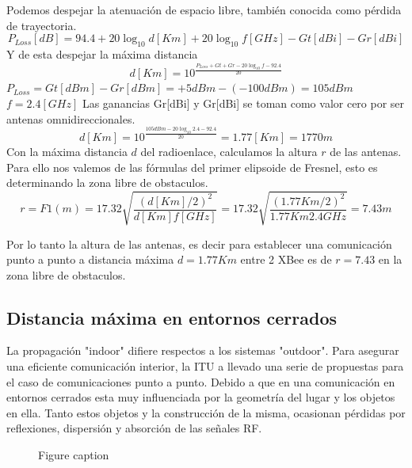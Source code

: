 \documentclass[11pt,oneside,spanish,a4paper]{article}
\begin{document}
Podemos despejar la atenuaci\'on de espacio libre, tambi\'en conocida como p\'erdida de trayectoria.
\begin{equation*}
\label{Ec:perdida}
P_{Loss}[dB] = 94.4 + 20 \log_{10}d [Km] + 20 \log_{10}f [GHz] - Gt[dBi] - Gr[dBi]
\end{equation*}
	Y de esta despejar la m\'axima distancia
\begin{equation*}
\label{Ec:distancia}
d[Km] = 10^{\frac{P_{Loss} + Gt + Gr - 20 \log_{10}f - 92.4}{20}}
\end{equation*}
$P_{Loss}=Gt[dBm] - Gr[dBm] = +5dBm - (-100dBm) = 105dBm$
$f = 2.4 [GHz]$
Las ganancias Gr[dBi] y Gr[dBi] se toman como valor cero por ser antenas omnidireccionales.
\begin{equation*}
\label{Ec:distancia1}
d[Km] = 10^{\frac{105 dBm - 20 \log_{10}2.4 - 92.4}{20}} = 1.77 [Km] =1770m
\end{equation*}	
Con la m\'axima distancia $d$ del radioenlace, calculamos la altura $r$ de las antenas. Para ello nos valemos de las f\'ormulas del primer elipsoide de Fresnel, esto es determinando la zona libre de obstaculos.
\begin{equation*}
\label{Ec:fresnel}
r = F1(m) = 17.32 \sqrt{\frac{(d[Km]/2)^2}{d[Km]f[GHz]}} = 17.32 \sqrt{\frac{(1.77Km/2)^2}{1.77Km2.4GHz}} = 7.43m
\end{equation*}	

Por lo tanto la altura de las antenas, es decir para establecer una comunicaci\'on punto a punto a distancia m\'axima $d=1.77Km$ entre 2 XBee es de $r=7.43$ en la zona libre de obstaculos.

\subsection{Distancia m\'axima en entornos cerrados}

La propagaci\'on "indoor" difiere respectos a los sistemas "outdoor". Para asegurar una eficiente comunicaci\'on interior, la ITU a llevado una serie de propuestas para el caso de comunicaciones punto a punto. Debido a que en una comunicaci\'on en entornos cerrados esta muy influenciada por la geometr\'ia del lugar y los objetos en ella. Tanto estos objetos y la construcci\'on de la misma, ocasionan p\'erdidas por reflexiones, dispersi\'on y absorci\'on de las se\~nales RF.  

\begin{figure}[h]
\caption{Figure caption}
\end{figure}
\end{document}
